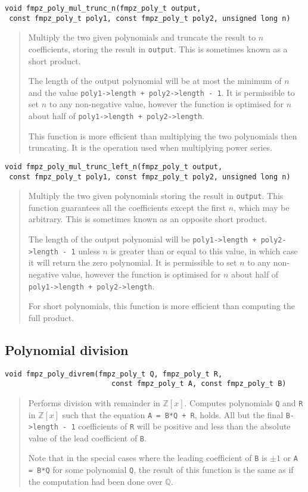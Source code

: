 \documentclass[a4paper,10pt]{article}
\newcommand{\Z}{\mathbb{Z}}
\newcommand{\Q}{\mathbb{Q}}
\newcommand{\code}{\lstinline}
\begin{document}
\begin{lstlisting}
void fmpz_poly_mul_trunc_n(fmpz_poly_t output, 
 const fmpz_poly_t poly1, const fmpz_poly_t poly2, unsigned long n) 
\end{lstlisting}
\begin{quote}
Multiply the two given polynomials and truncate the result to $n$ coefficients, storing the result in \code{output}. This is sometimes known as a short product.

The length of the output polynomial will be at most the minimum of $n$ and the value \code{poly1->length + poly2->length - 1}. It is permissible to set $n$ to any non-negative value, however the function is optimised for $n$ about half of \code{poly1->length + poly2->length}.

This function is more efficient than multiplying the two polynomials then truncating. It is the operation used when multiplying power series.
\end{quote}

\begin{lstlisting}
void fmpz_poly_mul_trunc_left_n(fmpz_poly_t output, 
 const fmpz_poly_t poly1, const fmpz_poly_t poly2, unsigned long n) 
\end{lstlisting}
\begin{quote}
Multiply the two given polynomials storing the result in \code{output}. This function guarantees all the coefficients except the first $n$, which may be arbitrary. This is sometimes known as an opposite short product.

The length of the output polynomial will be \code{poly1->length + poly2->length - 1} unless $n$ is greater than or equal to this value, in which case it will return the zero polynomial. It is permissible to set $n$ to any non-negative value, however the function is optimised for $n$ about half of \code{poly1->length + poly2->length}.

For short polynomials, this function is more efficient than computing the full product.
\end{quote}

\subsection{Polynomial division}

\begin{lstlisting}
void fmpz_poly_divrem(fmpz_poly_t Q, fmpz_poly_t R, 
                         const fmpz_poly_t A, const fmpz_poly_t B) 
\end{lstlisting}
\begin{quote}
Performs division with remainder in $\Z[x]$. Computes polynomials \code{Q} and \code{R} in $\Z[x]$ such that the equation \code{A = B*Q + R}, holds. All but the final \code{B->length - 1} coefficients of \code{R} will be positive and less than the absolute value of the lead coefficient of \code{B}.

Note that in the special cases where the leading coefficient of \code{B} is $\pm 1$ or \code{A = B*Q} for some polynomial \code{Q}, the result of this function is the same as if the computation had been done over $\Q$.
\end{quote}
\end{document}
